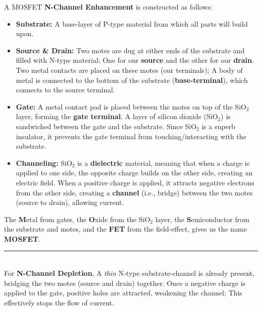 \begin{Def}

    \label{def:mosfet}

    A MOSFET \textbf{N-Channel Enhancement} is constructed as follows:
    \begin{itemize}
      \item \textbf{Substrate:} A base-layer of P-type material from which all parts will build upon.
      \item \textbf{Source \& Drain:} Two motes are dug at either ends of the substrate and filled with N-type material;
      One for our \textbf{source} and the other for our \textbf{drain}. Two metal contacts are placed on these motes (our terminals);
      A body of metal is connected to the bottom of the substrate (\textbf{base-terminal}), which connects to the source terminal.
      \item \textbf{Gate:} A metal contact pad is placed between the motes on top of the SiO$_2$ layer, forming the \textbf{gate terminal}.
      A layer of silicon dioxide (SiO$_2$) is sandwiched between the gate and the substrate.
      Since SiO$_2$ is a superb insulator, it prevents the gate terminal from touching/interacting with the substrate.
      \item \textbf{Channeling:} SiO$_2$ is a \textbf{dielectric} material, meaning that when a charge is applied to one side, the opposite charge builds on the other side,
      creating an electric field. When a positive charge is applied, it attracts negative electrons from the other side, creating a \textbf{channel} (i.e., bridge)
      between the two motes (source to drain), allowing current.
    \end{itemize}
    
    \noindent
    The \textbf{M}etal from gates, the \textbf{O}xide from the SiO$_2$ layer, the \textbf{S}emiconductor from the substrate and motes, and 
    the \textbf{FET} from the field-effect, gives us the name \textbf{MOSFET}.

    \noindent
    \rule{\textwidth}{0.4pt}\\
    \noindent
    For \textbf{N-Channel Depletion}, A \emph{thin} N-type substrate-channel is already present, bridging the two motes (source and drain) together.
    Once a negative charge is applied to the gate, positive holes are attracted, weakening the channel; This effectively stops the flow of current.
\end{Def}

